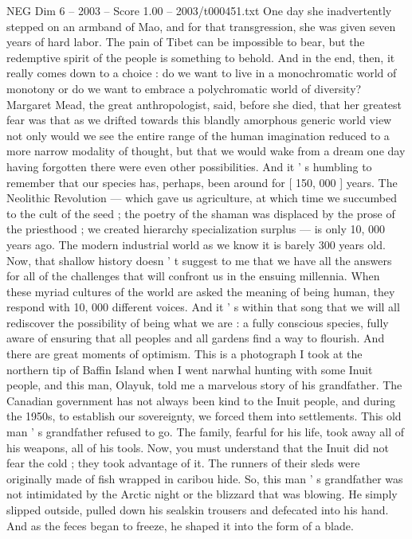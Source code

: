 \begin{textsample}{NEG Dim 6 – 2003 – Score 1.00 – 2003/t000451.txt}
One day she inadvertently stepped on an armband of Mao, and for that transgression, she was given seven years of hard labor.
The pain of Tibet can be impossible to bear, but the redemptive spirit of the people is something to behold.
And in the end, then, it really comes down to a choice : do we want to live in a monochromatic world of monotony or do we want to embrace a polychromatic world of diversity?
Margaret Mead, the great anthropologist, said, before she died, that her greatest fear was that as we drifted towards this blandly amorphous generic world view not only would we see the entire range of the human imagination reduced to a more narrow modality of thought, but that we would wake from a dream one day having forgotten there were even other possibilities.
And it ' s humbling to remember that our species has, perhaps, been around for [ 150, 000 ] years.
The Neolithic Revolution — which gave us agriculture, at which time we succumbed to the cult of the seed ; the poetry of the shaman was displaced by the prose of the priesthood ; we created hierarchy specialization surplus — is only 10, 000 years ago.
The modern industrial world as we know it is barely 300 years old.
Now, that shallow history doesn ' t suggest to me that we have all the answers for all of the challenges that will confront us in the ensuing millennia.
When these myriad cultures of the world are asked the meaning of being human, they respond with 10, 000 different voices.
And it ' s within that song that we will all rediscover the possibility of being what we are : a fully conscious species, fully aware of ensuring that all peoples and all gardens find a way to flourish.
And there are great moments of optimism.
This is a photograph I took at the northern tip of Baffin Island when I went narwhal hunting with some Inuit people, and this man, Olayuk, told me a marvelous story of his grandfather.
The Canadian government has not always been kind to the Inuit people, and during the 1950s, to establish our sovereignty, we forced them into settlements.
This old man ' s grandfather refused to go.
The family, fearful for his life, took away all of his weapons, all of his tools.
Now, you must understand that the Inuit did not fear the cold ; they took advantage of it.
The runners of their sleds were originally made of fish wrapped in caribou hide.
So, this man ' s grandfather was not intimidated by the Arctic night or the blizzard that was blowing.
He simply slipped outside, pulled down his sealskin trousers and defecated into his hand.
And as the feces began to freeze, he shaped it into the form of a blade.

\end{textsample}
